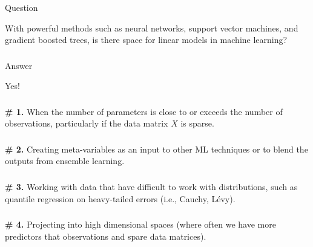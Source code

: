\begin{frame}[fragile] \frametitle{}

{\color{yaleblue}\fontsize{16pt}{20pt}\selectfont Question}

With powerful methods such as neural networks, support vector
machines, and gradient boosted trees, is there space for
linear models in machine learning?

\end{frame}

\begin{frame}[fragile] \frametitle{}

{\color{yaleblue}\fontsize{16pt}{20pt}\selectfont Answer}

Yes!

\end{frame}

\begin{frame}[fragile] \frametitle{}

{\bf \# 1.} When the number of parameters is close to or exceeds the
number of observations, particularly if the data matrix $X$ is sparse.

\end{frame}

\begin{frame}[fragile] \frametitle{}

{\bf \# 2.} Creating meta-variables as an input to other ML techniques
or to blend the outputs from ensemble learning.

\end{frame}

\begin{frame}[fragile] \frametitle{}

{\bf \# 3.} Working with data that have difficult to
work with distributions, such as quantile regression on
heavy-tailed errors (i.e., Cauchy, Lévy).

\end{frame}

\begin{frame}[fragile] \frametitle{}

{\bf \# 4.} Projecting into high dimensional spaces (where often
we have more predictors that observations and spare data matrices).

\end{frame}

